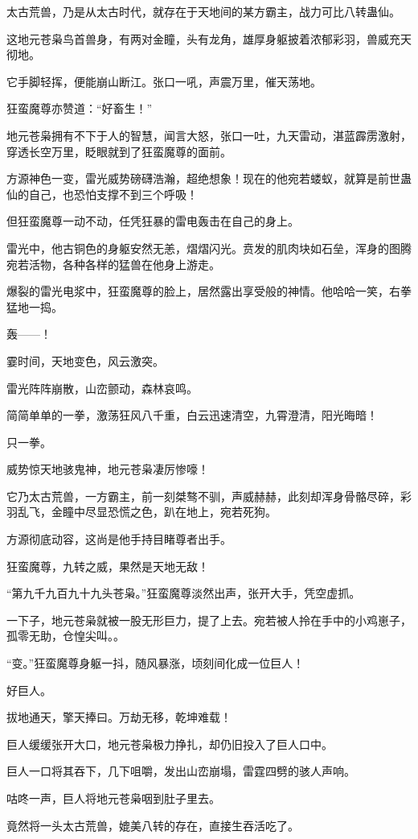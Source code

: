 \begin{this_body}
太古荒兽，乃是从太古时代，就存在于天地间的某方霸主，战力可比八转蛊仙。

这地元苍枭鸟首兽身，有两对金瞳，头有龙角，雄厚身躯披着浓郁彩羽，兽威充天彻地。

它手脚轻挥，便能崩山断江。张口一吼，声震万里，催天荡地。

狂蛮魔尊亦赞道：“好畜生！”

地元苍枭拥有不下于人的智慧，闻言大怒，张口一吐，九天雷动，湛蓝霹雳激射，穿透长空万里，眨眼就到了狂蛮魔尊的面前。

方源神色一变，雷光威势磅礴浩瀚，超绝想象！现在的他宛若蝼蚁，就算是前世蛊仙的自己，也恐怕支撑不到三个呼吸！

但狂蛮魔尊一动不动，任凭狂暴的雷电轰击在自己的身上。

雷光中，他古铜色的身躯安然无恙，熠熠闪光。贲发的肌肉块如石垒，浑身的图腾宛若活物，各种各样的猛兽在他身上游走。

爆裂的雷光电浆中，狂蛮魔尊的脸上，居然露出享受般的神情。他哈哈一笑，右拳猛地一捣。

轰——！

霎时间，天地变色，风云激突。

雷光阵阵崩散，山峦颤动，森林哀鸣。

简简单单的一拳，激荡狂风八千重，白云迅速清空，九霄澄清，阳光晦暗！

只一拳。

威势惊天地骇鬼神，地元苍枭凄厉惨嚎！

它乃太古荒兽，一方霸主，前一刻桀骜不驯，声威赫赫，此刻却浑身骨骼尽碎，彩羽乱飞，金瞳中尽显恐慌之色，趴在地上，宛若死狗。

方源彻底动容，这尚是他手持目睹尊者出手。

狂蛮魔尊，九转之威，果然是天地无敌！

“第九千九百九十九头苍枭。”狂蛮魔尊淡然出声，张开大手，凭空虚抓。

一下子，地元苍枭就被一股无形巨力，提了上去。宛若被人拎在手中的小鸡崽子，孤零无助，仓惶尖叫。。

“变。”狂蛮魔尊身躯一抖，随风暴涨，顷刻间化成一位巨人！

好巨人。

拔地通天，擎天捧曰。万劫无移，乾坤难载！

巨人缓缓张开大口，地元苍枭极力挣扎，却仍旧投入了巨人口中。

巨人一口将其吞下，几下咀嚼，发出山峦崩塌，雷霆四劈的骇人声响。

咕咚一声，巨人将地元苍枭咽到肚子里去。

竟然将一头太古荒兽，媲美八转的存在，直接生吞活吃了。


\end{this_body}
